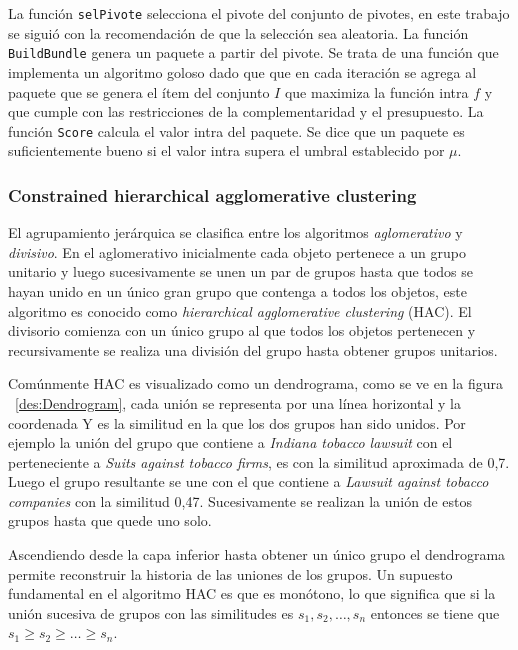 La función \texttt{selPivote} selecciona el pivote del conjunto de pivotes, en este trabajo se siguió con la recomendación de \cite{newSimilarity} que la selección sea aleatoria. La función \texttt{BuildBundle} genera un paquete a partir del pivote. Se trata de una función que implementa un algoritmo goloso dado que que en cada iteración se agrega al paquete que se genera el ítem del conjunto $I$ que maximiza la función intra $f$ y que cumple con las restricciones de la complementaridad y el presupuesto. La función \texttt{Score} calcula el valor intra del paquete. Se dice que un paquete es suficientemente bueno si el valor intra supera el umbral establecido por $\mu$.

\subsubsection{Constrained hierarchical agglomerative clustering}
El agrupamiento jerárquica se clasifica entre los algoritmos \textit{aglomerativo} y \textit{divisivo}. En el aglomerativo inicialmente cada objeto pertenece a un grupo unitario y luego sucesivamente se unen un par de grupos hasta que todos se hayan unido en un único gran grupo que contenga a todos los objetos, este algoritmo es conocido como \textit{hierarchical agglomerative clustering} (HAC). El divisorio comienza con un único grupo al que todos los objetos pertenecen y recursivamente se realiza una división del grupo hasta obtener grupos unitarios.

Comúnmente HAC es visualizado como un dendrograma, como se ve en la figura ~\ref{des:Dendrogram}, cada unión se representa por una línea horizontal y la coordenada Y es la similitud en la que los dos grupos han sido unidos. Por ejemplo la unión del grupo que contiene a \textit{Indiana tobacco lawsuit} con el perteneciente a \textit{Suits against tobacco firms}, es con la similitud aproximada de 0,7. Luego el grupo resultante se une con el que contiene a \textit{Lawsuit against tobacco companies} con la similitud 0,47. Sucesivamente se realizan la unión de estos grupos hasta que quede uno solo.

Ascendiendo desde la capa inferior hasta obtener un único grupo el dendrograma permite reconstruir la historia de las uniones de los grupos. Un supuesto fundamental en el algoritmo HAC es que es monótono, lo que significa que si la unión sucesiva de grupos con las similitudes es $s_1,s_2,\ldots,s_n$ entonces se tiene que $s_1 \geq s_2 \geq \ldots \geq s_n$.

